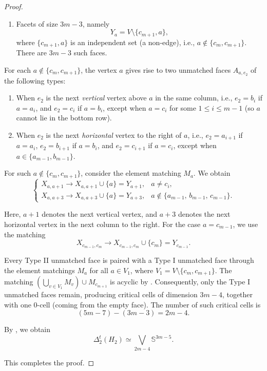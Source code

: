 \documentclass[11pt,reqno,a4paper]{amsart}
\theoremstyle{definition}
\theoremstyle{theorem}
\newcommand{\lno}{\left(}
\newcommand{\rno}{\right)}
\newcommand{\bbS}{\mathbb{S}}
\theoremstyle{remark}
\begin{document}
\begin{proof}
\begin{enumerate}[label=\textbf{Type }\Roman*:, leftmargin=4em]
    \item Facets of size $3m-3$, namely
    \[
        Y_a = V \setminus \{c_{m+1}, a\},
    \]
    where $\{c_{m+1}, a\}$ is an independent set (a non-edge), 
    i.e., $a \notin \{c_m, c_{m+1}\}$. 
    There are $3m - 3$ such faces.
    \end{enumerate}
    
    For each $a \notin \{c_{m}, c_{m+1}\}$, the vertex $a$ gives rise to two unmatched faces $A_{a,e_2}$ of the following types:
    
    \begin{enumerate}[label=\roman*., leftmargin=3em]
        \item When $e_2$ is the next \emph{vertical} vertex above $a$ in the same column,  
        i.e., $e_2 = b_i$ if $a = a_i$, and $e_2 = c_i$ if $a = b_i$,  
        except when $a = c_i$ for some $1 \le i \le m-1$  
        (so $a$ cannot lie in the bottom row).
    
        \item When $e_2$ is the next \emph{horizontal} vertex to the right of $a$,  
        i.e., $e_2 = a_{i+1}$ if $a = a_i$,  
        $e_2 = b_{i+1}$ if $a = b_i$,  
        and $e_2 = c_{i+1}$ if $a = c_i$,  
        except when $a \in \{a_{m-1}, b_{m-1}\}$.
    \end{enumerate}
    
    \noindent
    For such $a \notin \{c_m, c_{m+1}\}$, consider the element matching $M_a$.  
    We obtain
    \[
    \begin{cases}
        X_{a,a+1} \longrightarrow X_{a,a+1} \cup \{a\} = Y_{a+1}, 
            & a \neq c_i,\\[4pt]
        X_{a,a+3} \longrightarrow X_{a,a+3} \cup \{a\} = Y_{a+3}, 
            & a \notin \{a_{m-1},\, b_{m-1},\, c_{m-1}\}.
    \end{cases}
    \]

    Here, $a+1$ denotes the next vertical vertex, and $a+3$ denotes the next horizontal vertex in the next column to the right. 
For the case $a = c_{m-1}$, we use the matching
\[
    X_{c_{m-1}, c_{m}} \longrightarrow 
    X_{c_{m-1}, c_{m}} \cup \{c_{m}\} 
    = Y_{c_{m-1}}.
\]

Every Type II unmatched face is paired with a Type I unmatched face through the element matchings $M_a$ for all 
$a \in V_1$, where 
\( V_1 = V \setminus \{c_m, c_{m+1}\} \). 
The matching $\lno \bigcup\limits_{v \in V_1} M_{v} \rno \cup M_{c_{m+1}}$
is acyclic by . 
Consequently, only the Type I unmatched faces remain, producing critical cells of dimension $3m-4$, together with one $0$-cell (coming from the empty face). 
The number of such critical cells is
\[
(5m-7) - (3m-3) = 2m - 4.
\]

By , we obtain
\[
    \Delta_2^t \lno H_2 \rno 
    \simeq 
    \bigvee_{2m-4} \bbS^{3m-5}.
\]

This completes the proof.
\end{proof}
\end{document}
